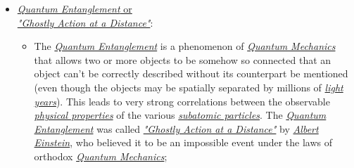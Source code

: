 \documentclass[conference]{IEEEtran}
\begin{document}
\begin{itemize}
  \item \href{https://en.wikipedia.org/wiki/Quantum_entanglement}{\textit{Quantum Entanglement} or \\\textit{"Ghostly Action at a Distance"}}:
   
    \begin{itemize}
        \item The \href{https://en.wikipedia.org/wiki/Quantum_entanglement}{\textit{Quantum Entanglement}} is a phenomenon of \href{https://en.wikipedia.org/wiki/Quantum_mechanics}{\textit{Quantum Mechanics}} that allows two or more objects to be somehow so connected that an object can't be correctly described without its counterpart be mentioned (even though the objects may be spatially separated by millions of \href{https://en.wikipedia.org/wiki/Light-year}{\textit{light years}}). This leads to very strong correlations between the observable \href{https://en.wikipedia.org/wiki/Physical_property}{\textit{physical properties}} of the various \href{https://en.wikipedia.org/wiki/Subatomic_particle}{\textit{subatomic particles}}. The \href{https://en.wikipedia.org/wiki/Quantum_entanglement}{\textit{Quantum Entanglement}} was called \href{https://en.wikipedia.org/wiki/Quantum_entanglement}{\textit{"Ghostly Action at a Distance"}} by \href{https://en.wikipedia.org/wiki/Albert_Einstein}{\textit{Albert Einstein}}, who believed it to be an impossible event under the laws of orthodox \href{https://en.wikipedia.org/wiki/Quantum_mechanics}{\textit{Quantum Mechanics}};
    \end{itemize}
    
\end{itemize}
\end{document}
